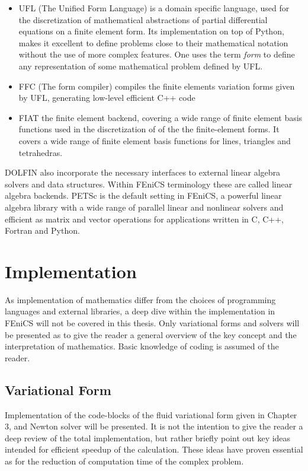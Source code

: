 \begin{itemize} 
\item UFL (The Unified Form Language)  is a domain specific language, used for the discretization of mathematical abstractions of partial differential equations on a finite element form. Its implementation on top of Python, makes it excellent to define problems close to their mathematical notation without the use of more complex features. One uses the term \textit{form} to define any representation of some mathematical problem defined by UFL.   

\item FFC (The form compiler) compiles the finite elements variation forms given by UFL, generating low-level efficient C++ code 

\item FIAT the finite element backend, covering a wide range of finite element basis functions used in the discretization of of the  the finite-element forms. It covers a wide range of finite element basis functions for lines, triangles and tetrahedras.

\end{itemize}  


DOLFIN also incorporate the necessary interfaces to external linear algebra solvers and data structures. Within FEniCS terminology these are called linear algebra backends. PETSc is the default setting in FEniCS, a powerful linear algebra library
with a wide range of parallel linear and nonlinear solvers and efficient as matrix and vector operations for applications written in C, C++, Fortran and Python.
\newpage

\section{Implementation}
As implementation of mathematics differ from the choices of programming languages and external libraries, a deep dive within the implementation in FEniCS will not be covered in this thesis. Only variational forms and solvers will be presented as to give the reader a general overview of the key concept and the interpretation of mathematics. Basic knowledge of coding is assumed of the reader. 

\subsection{Variational Form}
Implementation of the code-blocks of the fluid variational form given in Chapter 3, and Newton solver will be presented. It is not the intention to give the reader a deep review of the total implementation, but rather briefly point out key ideas intended for efficient speedup of the calculation. These ideas have proven essential as for the reduction of computation time of the complex problem.

